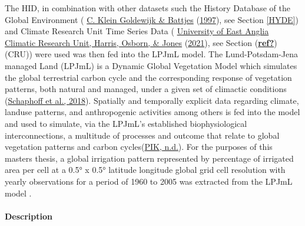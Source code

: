 \documentclass[12pt,twoside]{reedthesis}
\begin{document}
The HID, in combination with other datasets such the History Database of the Global Environment ( \protect\hyperlink{ref-kleingoldewijkHundredYear18901997}{C. Klein Goldewijk \& Battjes} (\protect\hyperlink{ref-kleingoldewijkHundredYear18901997}{1997}), see Section \ref{HYDE}) and Climate Research Unit Time Series Data ( \protect\hyperlink{ref-universityofeastangliaclimaticresearchunitVersionCRUTS2021}{University of East Anglia Climatic Research Unit, Harris, Osborn, \& Jones} (\protect\hyperlink{ref-universityofeastangliaclimaticresearchunitVersionCRUTS2021}{2021}), see Section (\protect\hyperlink{ref-ref}{\textbf{ref?}})(CRU)) were used was then fed into the LPJmL model. The Lund-Potsdam-Jena managed Land (LPJmL) is a Dynamic Global Vegetation Model which simulates the global terrestrial carbon cycle and the corresponding response of vegetation patterns, both natural and managed, under a given set of climactic conditions (\protect\hyperlink{ref-schaphoffLPJmL4DynamicGlobal2018}{Schaphoff et al., 2018}). Spatially and temporally explicit data regarding climate, landuse patterns, and anthropogenic activities among others is fed into the model and used to simulate, via the LPJmL's established biophysiological interconnections, a multitude of processes and outcome that relate to global vegetation patterns and carbon cycles(\protect\hyperlink{ref-pikLPJmLLundPotsdamJenaManaged}{PIK, n.d.}). For the purposes of this masters thesis, a global irrigation pattern represented by percentage of irrigated area per cell at a 0.5° x 0.5° latitude longitude global grid cell resolution with yearly observations for a period of 1960 to 2005 was extracted from the LPJmL model .

\hypertarget{irrfracdesc}{%
\paragraph{Description}\label{irrfracdesc}}
\end{document}
